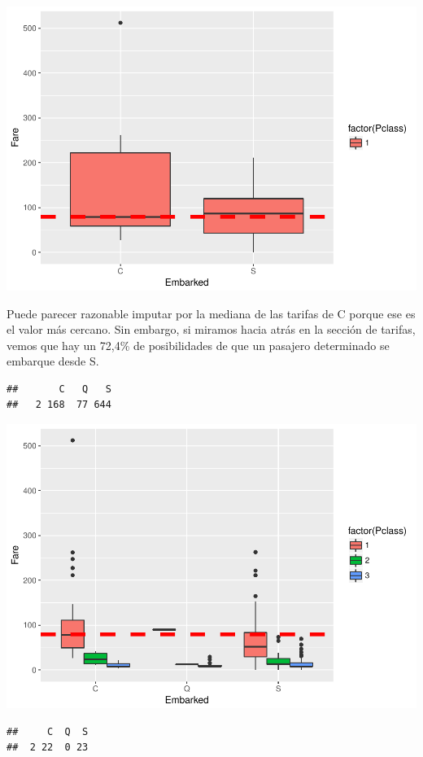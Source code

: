 \documentclass[]{article}
\begin{document}
\includegraphics{titanicDataClean_files/figure-latex/bark-1.pdf}

Puede parecer razonable imputar por la mediana de las tarifas de C
porque ese es el valor más cercano. Sin embargo, si miramos hacia atrás
en la sección de tarifas, vemos que hay un 72,4\% de posibilidades de
que un pasajero determinado se embarque desde S.

\begin{verbatim}
##       C   Q   S 
##   2 168  77 644
\end{verbatim}

\includegraphics{titanicDataClean_files/figure-latex/split-1.pdf}

\begin{verbatim}
##     C  Q  S 
##  2 22  0 23
\end{verbatim}
\end{document}
